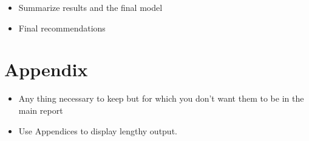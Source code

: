 \documentclass[
]{article}
\providecommand{\tightlist}{%
  \setlength{\itemsep}{0pt}\setlength{\parskip}{0pt}}
\begin{document}
\begin{itemize}
\tightlist
\item
  Summarize results and the final model
\item
  Final recommendations
\end{itemize}

\hypertarget{appendix}{%
\section{Appendix}\label{appendix}}

\begin{itemize}
\tightlist
\item
  Any thing necessary to keep but for which you don't want them to be in
  the main report
\item
  Use Appendices to display lengthy output.
\end{itemize}
\end{document}
